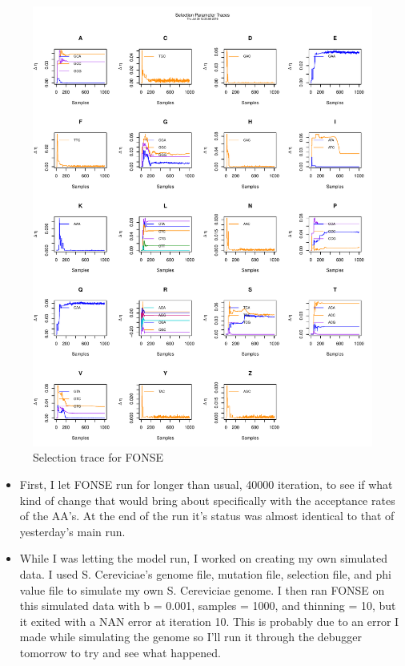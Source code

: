 \documentclass[11pt]{labbook}
\begin{document}
    \begin{figure}
        \centering
        \includegraphics[scale=.65]{FONSE_Plots/2016/July_28/SelectionTrace}
        \caption{Selection trace for FONSE}
        \label{fig:JULY28_SEL}
    \end{figure}
    
    \begin{itemize}
        \item First, I let FONSE run for longer than usual, 40000 iteration, to see if what kind of change that would bring about specifically with the acceptance rates of the AA's. At the end of the run it's status was almost identical to that of yesterday's main run. 
        \item While I was letting the model run, I worked on creating my own simulated data. I used S. Cereviciae's genome file, mutation file, selection file, and phi value file to simulate my own S. Cereviciae genome. I then ran FONSE on this simulated data with b = 0.001, samples = 1000, and thinning = 10, but it exited with a NAN error at iteration 10. This is probably due to an error I made while simulating the genome so I'll run it through the debugger tomorrow to try and see what happened.
    \end{itemize}
    
\end{document}
